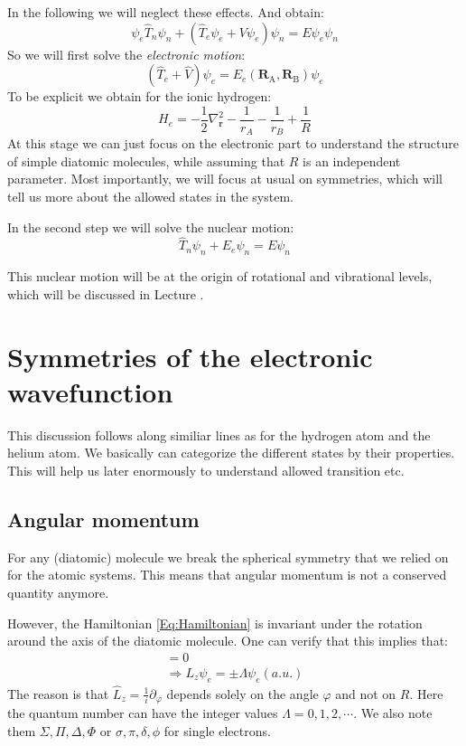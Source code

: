 \documentclass[10pt]{article}
\let\cite\citep
\providecommand\citep{\cite}
\newcommand{\vecRA}{\mathbf{R}_\mathrm{A}}
\newcommand{\vecRB}{\mathbf{R}_\mathrm{B}}
\begin{document}
In the following we will neglect these effects. And obtain:
\begin{equation}
\psi_e \hat{T}_n\psi_n + \left(\hat{T}_e\psi_e+V\psi_e\right)\psi_n = E \psi_e\psi_n
\end{equation}
So we will first solve the \textit{electronic motion}:
\begin{equation}
\left(\hat{T}_e+\hat{V}\right)\psi_e = E_e(\vecRA, \vecRB) \psi_e
\end{equation}
To be explicit we obtain for the ionic hydrogen:
\begin{equation}\label{Eq:Hamiltonian}
H_e = -\frac{1}{2} \nabla_\mathbf{r}^2-\frac{1}{r_A}-\frac{1}{r_B}+\frac{1}{R}
\end{equation}
At this stage we can just focus on the electronic part to understand the structure of simple diatomic molecules, while assuming that $R$ is an independent parameter. Most importantly, we will focus at usual on symmetries, which will tell us more about the allowed states in the system.

In the second step we will solve the nuclear motion:
\begin{equation}
\hat{T}_n\psi_n + E_e \psi_n = E \psi_n
\end{equation}

This nuclear motion will be at the origin of rotational and vibrational levels, which will be discussed in Lecture \cite{molecules}.




\section{Symmetries of the electronic wavefunction}
This discussion follows along similiar lines as for the hydrogen atom and the helium atom. We basically can categorize the different states by their properties. This will help us later enormously to understand allowed transition etc.

\subsection{Angular momentum}
For any (diatomic) molecule we break the spherical symmetry that we relied on for the atomic systems. This means that angular momentum is not a conserved quantity anymore.

However, the Hamiltonian \eqref{Eq:Hamiltonian} is invariant under the rotation around the axis of the diatomic molecule. One can verify that this implies that:
\begin{eqnarray}
[H_e, L_z] = 0\\
\Rightarrow L_z \psi_e = \pm \Lambda \psi_e (a.u.)
\end{eqnarray}
The reason is that $\hat{L}_z =\frac{1}{i}\partial_\varphi$ depends solely on the angle $\varphi$ and not on $R$. Here the quantum number can have the integer values $\Lambda= 0, 1, 2 , \cdots$. We also note them $\Sigma, \Pi, \Delta, \Phi$ or $\sigma, \pi, \delta, \phi$ for single electrons. 
\end{document}
